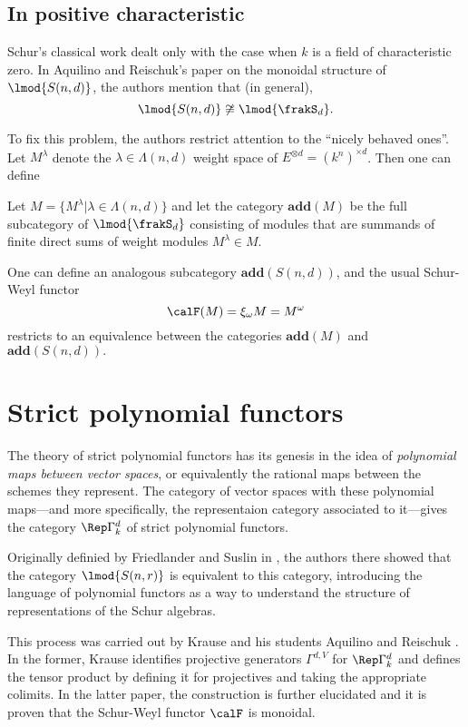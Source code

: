 \documentclass[12pt]{article}
\begin{document}
\subsection{In positive characteristic}
Schur's classical work dealt only with the case when $k$ is a field of characteristic zero. In Aquilino and Reischuk's paper 
on the monoidal structure of $\lmod{S(n,d)}$, the authors mention that (in general),
\[\lmod{S(n,d)}\not\cong\lmod{\frakS_d}.\]

To fix this problem, the authors restrict attention to the ``nicely behaved ones''. Let $M^\lambda$ denote 
the $\lambda\in\Lambda(n,d)$ weight space of $E^{\otimes d}=(k^n)^{\times d}$. Then one can define 
\begin{defn}
	Let $M=\{M^\lambda|\lambda\in\Lambda(n,d)\}$ and let the category $\mathbf{add}(M)$ be the full subcategory of $\lmod{\frakS_d}$ consisting 
	of modules that are summands of finite direct sums of weight modules $M^\lambda\in M$.
\end{defn}
One can define an analogous subcategory $\mathbf{add}(S(n,d))$, and the usual Schur-Weyl functor 
\[\calF(M)=\xi_\omega M=M^\omega\]
restricts to an equivalence between the categories $\mathbf{add}(M)$ and $\mathbf{add}(S(n,d)).$


\newpage
\section{Strict polynomial functors}
The theory of strict polynomial functors has its genesis in the idea of \textit{polynomial maps between vector spaces},
or equivalently the rational maps between the schemes they represent. The category of vector spaces with these polynomial maps---and 
more specifically, the representaion category associated to it---gives the category $\Rep \Gamma^d_k$ of strict polynomial functors. 

Originally definied by Friedlander and Suslin in \cite{friedlander-suslin}, the authors there showed that 
the category $\lmod{S(n,r)}$ is equivalent to this category, introducing the language of polynomial functors as 
a way to understand the structure of representations of the Schur algebras. 

This process was carried out by Krause \cite{krause-strict-poly-func} and his students Aquilino and Reischuk \cite{aquilino-reischuk}.
In the former, Krause identifies projective generators $\Gamma^{d,V}$ for $\Rep\Gamma^d_k$ and defines the tensor product 
by defining it for projectives and taking the appropriate colimits. In the latter paper, the construction 
is further elucidated and it is proven that the Schur-Weyl functor $\calF$ is monoidal.
\end{document}
